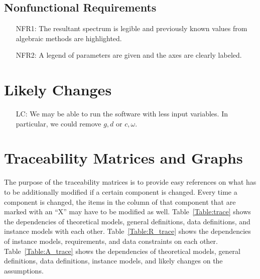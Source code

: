 \documentclass[12pt]{article}
\newcounter{lcnum} %
\begin{document}
\subsection{Nonfunctional Requirements}
\noindent \begin{itemize}
\item[NFR1:] The resultant spectrum is legible and previously known values from 
algebraic methods are highlighted. 
\item[NFR2:] A legend of parameters are given and the axes are clearly labeled.
\end{itemize}


\section{Likely Changes}    

\noindent \begin{itemize}

\item[LC\refstepcounter{lcnum}\thelcnum\label{LC_meaningfulLabel}:] We may be 
able to run the software with less input variables. In particular, we could 
remove $g,d$ or $c, \omega$. 

\end{itemize}

\section{Traceability Matrices and Graphs}

The purpose of the traceability matrices is to provide easy references on what
has to be additionally modified if a certain component is changed.  Every time a
component is changed, the items in the column of that component that are marked
with an ``X'' may have to be modified as well.  Table~\ref{Table:trace} shows the
dependencies of theoretical models, general definitions, data definitions, and
instance models with each other. Table~\ref{Table:R_trace} shows the
dependencies of instance models, requirements, and data constraints on each
other. Table~\ref{Table:A_trace} shows the dependencies of theoretical models,
general definitions, data definitions, instance models, and likely changes on
the assumptions.\\
\end{document}
